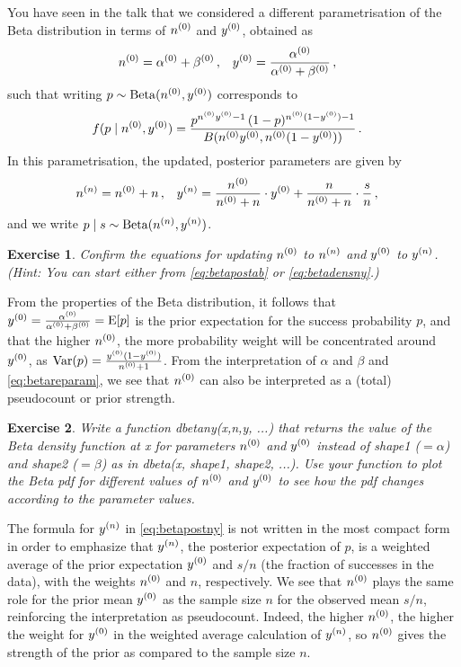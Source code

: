 \documentclass[12pt,a4paper	,twoside]{article}
\newcommand{\E}{\operatorname{E}}
\newcommand{\V}{\operatorname{Var}}
\newcommand{\be}{\operatorname{Beta}}
\newcommand{\code}[1]{\emph{\ttfamily #1}}
\newtheorem{myex}{Exercise}
\begin{document}
You have seen in the talk that we considered a different parametrisation of the Beta distribution
in terms of $n^{(0)}$ and $y^{(0)}$, obtained as
\begin{align}
n^{(0)} &= \alpha^{(0)} + \beta^{(0)}\,, & y^{(0)} &= \frac{\alpha^{(0)}}{\alpha^{(0)}+\beta^{(0)}}\,,
\label{eq:betareparam}
\end{align}
such that writing $p \sim \be(\nz,\yz)$ corresponds to
\begin{align}
f(p\mid n^{(0)},y^{(0)}) &= \frac{p^{n^{(0)}y^{(0)}-1}\, (1-p)^{n^{(0)}(1-y^{(0)})-1}}{B(n^{(0)}y^{(0)},n^{(0)}(1-y^{(0)}))}\,.
\label{eq:betadensny}
\end{align}
In this parametrisation, the updated, posterior parameters are given by
\begin{align}
n^{(n)} &= n^{(0)} + n\,, &
y^{(n)} &= \frac{n^{(0)}}{n^{(0)} + n} \cdot y^{(0)} + \frac{n}{n^{(0)} + n} \cdot \frac{s}{n}\,,
\label{eq:betapostny}
\end{align}
and we write $p\mid s \sim \be(\nn,\yn)$.

\begin{myex}
Confirm the equations for updating $n^{(0)}$ to $n^{(n)}$ and $y^{(0)}$ to $y^{(n)}$.
(Hint: You can start either from \eqref{eq:betapostab} or \eqref{eq:betadensny}.)
\end{myex}

From the properties of the Beta distribution,
it follows that $\yz = \frac{\az}{\az+\bz} = \E[p]$
is the prior expectation for the success probability $p$,
and that the higher $n^{(0)}$, the more probability weight will be concentrated around $y^{(0)}$,
as $\V(p) = \frac{\yz (1-\yz)}{\nz + 1}$.
From the interpretation of $\alpha$ and $\beta$ and \eqref{eq:betareparam},
we see that $n^{(0)}$ can also be interpreted as a (total) pseudocount or prior strength.

\begin{myex}\label{ex:dbetany}
Write a function \code{dbetany(x,n,y, ...)}
that returns the value of the Beta density function at \code{x}
for parameters $n^{(0)}$ and $y^{(0)}$ instead of \code{shape1} ($=\alpha$) and \code{shape2} ($=\beta$)
as in \code{dbeta(x, shape1, shape2, ...)}.
Use your function to plot the Beta pdf for different values of $n^{(0)}$ and $y^{(0)}$
to see how the pdf changes according to the parameter values.
\end{myex}

The formula for $y^{(n)}$ in \eqref{eq:betapostny} is not written in the most compact form
in order to emphasize that $y^{(n)}$, the posterior expectation of $p$,
is a weighted average of the prior expectation $y^{(0)}$ and $s/n$ (the fraction of successes in the data),
with the weights $n^{(0)}$ and $n$, respectively.
We see that $n^{(0)}$ plays the same role for the prior mean $y^{(0)}$
as the sample size $n$ for the observed mean $s/n$,
reinforcing the interpretation as pseudocount.
Indeed, the higher $n^{(0)}$, the higher the weight for $y^{(0)}$
in the weighted average calculation of $y^{(n)}$,
so $n^{(0)}$ gives the strength of the prior as compared to the sample size $n$.
\end{document}
